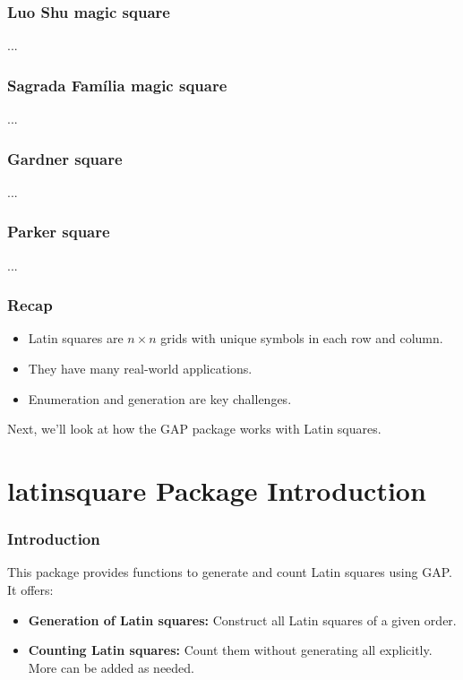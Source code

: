 \documentclass{beamer}
\begin{document}
\begin{frame}
\frametitle{Luo Shu magic square}
...
\end{frame}

\begin{frame}
\frametitle{Sagrada Família magic square}
...
\end{frame}

\begin{frame}
\frametitle{Gardner square}
...
\end{frame}

\begin{frame}
\frametitle{Parker square}
...
\end{frame}


\begin{frame}
\frametitle{Recap}
\begin{itemize}
  \item Latin squares are $n \times n$ grids with unique symbols in each row and column.
  \item They have many real-world applications.
  \item Enumeration and generation are key challenges.
\end{itemize}
Next, we'll look at how the GAP package works with Latin squares.
\end{frame}

\section{latinsquare Package Introduction}
\begin{frame}
\frametitle{Introduction}
This package provides functions to generate and count Latin squares using GAP. It offers:
\begin{itemize}
  \item \textbf{Generation of Latin squares:} Construct all Latin squares of a given order.
  \item \textbf{Counting Latin squares:} Count them without generating all explicitly.
More can be added as needed.
\end{itemize}
\end{frame}
\end{document}

